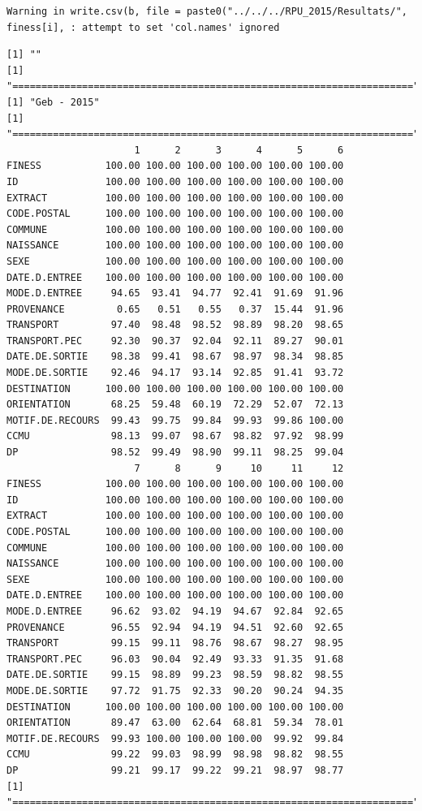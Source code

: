\documentclass[]{article}
\begin{document}
\begin{verbatim}
Warning in write.csv(b, file = paste0("../../../RPU_2015/Resultats/",
finess[i], : attempt to set 'col.names' ignored
\end{verbatim}

\begin{verbatim}
[1] ""
[1] "====================================================================="
[1] "Geb - 2015"
[1] "====================================================================="
                      1      2      3      4      5      6
FINESS           100.00 100.00 100.00 100.00 100.00 100.00
ID               100.00 100.00 100.00 100.00 100.00 100.00
EXTRACT          100.00 100.00 100.00 100.00 100.00 100.00
CODE.POSTAL      100.00 100.00 100.00 100.00 100.00 100.00
COMMUNE          100.00 100.00 100.00 100.00 100.00 100.00
NAISSANCE        100.00 100.00 100.00 100.00 100.00 100.00
SEXE             100.00 100.00 100.00 100.00 100.00 100.00
DATE.D.ENTREE    100.00 100.00 100.00 100.00 100.00 100.00
MODE.D.ENTREE     94.65  93.41  94.77  92.41  91.69  91.96
PROVENANCE         0.65   0.51   0.55   0.37  15.44  91.96
TRANSPORT         97.40  98.48  98.52  98.89  98.20  98.65
TRANSPORT.PEC     92.30  90.37  92.04  92.11  89.27  90.01
DATE.DE.SORTIE    98.38  99.41  98.67  98.97  98.34  98.85
MODE.DE.SORTIE    92.46  94.17  93.14  92.85  91.41  93.72
DESTINATION      100.00 100.00 100.00 100.00 100.00 100.00
ORIENTATION       68.25  59.48  60.19  72.29  52.07  72.13
MOTIF.DE.RECOURS  99.43  99.75  99.84  99.93  99.86 100.00
CCMU              98.13  99.07  98.67  98.82  97.92  98.99
DP                98.52  99.49  98.90  99.11  98.25  99.04
                      7      8      9     10     11     12
FINESS           100.00 100.00 100.00 100.00 100.00 100.00
ID               100.00 100.00 100.00 100.00 100.00 100.00
EXTRACT          100.00 100.00 100.00 100.00 100.00 100.00
CODE.POSTAL      100.00 100.00 100.00 100.00 100.00 100.00
COMMUNE          100.00 100.00 100.00 100.00 100.00 100.00
NAISSANCE        100.00 100.00 100.00 100.00 100.00 100.00
SEXE             100.00 100.00 100.00 100.00 100.00 100.00
DATE.D.ENTREE    100.00 100.00 100.00 100.00 100.00 100.00
MODE.D.ENTREE     96.62  93.02  94.19  94.67  92.84  92.65
PROVENANCE        96.55  92.94  94.19  94.51  92.60  92.65
TRANSPORT         99.15  99.11  98.76  98.67  98.27  98.95
TRANSPORT.PEC     96.03  90.04  92.49  93.33  91.35  91.68
DATE.DE.SORTIE    99.15  98.89  99.23  98.59  98.82  98.55
MODE.DE.SORTIE    97.72  91.75  92.33  90.20  90.24  94.35
DESTINATION      100.00 100.00 100.00 100.00 100.00 100.00
ORIENTATION       89.47  63.00  62.64  68.81  59.34  78.01
MOTIF.DE.RECOURS  99.93 100.00 100.00 100.00  99.92  99.84
CCMU              99.22  99.03  98.99  98.98  98.82  98.55
DP                99.21  99.17  99.22  99.21  98.97  98.77
[1] "====================================================================="
\end{verbatim}
\end{document}

